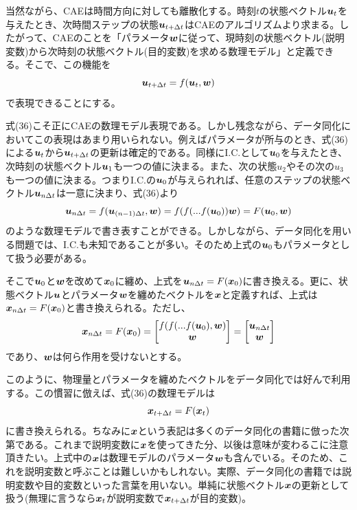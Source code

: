\documentclass[dvipdfmx, 9pt, a4paper]{jsarticle}
\newcommand{\bm}[1]{{\mbox{\boldmath $#1$}}}
\begin{document}
当然ながら、CAEは時間方向に対しても離散化する。時刻$t$の状態ベクトル$\bm u_t$を与えたとき、次時間ステップの状態$\bm u_{t+\Delta t}$はCAEのアルゴリズムより求まる。したがって、CAEのことを「パラメータ$\bm w$に従って、現時刻の状態ベクトル(説明変数)から次時刻の状態ベクトル(目的変数)を求める数理モデル」と定義できる。そこで、この機能を
\begin{equation}
\bm u_{t+\Delta t}=f(\bm u_t, \bm w)
\end{equation}
で表現できることにする。\par
式(36)こそ正にCAEの数理モデル表現である。しかし残念ながら、データ同化においてこの表現はあまり用いられない。例えばパラメータが所与のとき、式(36)による$\bm u_t$から$\bm u_{t+\Delta t}$の更新は確定的である。同様にI.C.として$\bm u_0$を与えたとき、次時刻の状態ベクトル$\bm u_1$も一つの値に決まる。また、次の状態$u_2$やその次の$u_3$も一つの値に決まる。つまりI.C.の$\bm u_0$が与えられれば、任意のステップの状態ベクトル$\bm u_{n\Delta t}$は一意に決まり、式(36)より
\begin{equation}
\bm u_{n\Delta t} =f(\bm u_{(n-1)\Delta t}, \bm w)=f(f( ... f(\bm u_0))\bm w)=F(\bm u_0, \bm w) \notag
\end{equation}
のような数理モデルで書き表すことができる。しかしながら、データ同化を用いる問題では、I.C.も未知であることが多い。そのため上式の$\bm u_0$もパラメータとして扱う必要がある。\par
そこで$\bm u_0$と$\bm w$を改めて$\bm x_0$に纏め、上式を$\bm u_{n\Delta t}=F(\bm x_0)$に書き換える。更に、状態ベクトル$\bm u$とパラメータ$\bm w$を纏めたベクトルを$\bm x$と定義すれば、上式は$\bm x_{n\Delta t}=F(\bm x_0)$と書き換えられる。ただし、
\begin{equation}
\bm x_{n\Delta t}=F(\bm x_0)=
\begin{bmatrix}
f(f(...f(\bm u_0), \bm w) \\ \bm w
\end{bmatrix}=
\begin{bmatrix}
\bm u_{n\Delta t} \\ \bm w
\end{bmatrix}\notag
\end{equation}
であり、$\bm w$は何ら作用を受けないとする。\par
このように、物理量とパラメータを纏めたベクトルをデータ同化では好んで利用する。この慣習に倣えば、式(36)の数理モデルは
\begin{equation}
\bm x_{t+\Delta t}=F(\bm x_t) \notag
\end{equation}
に書き換えられる。ちなみに$\bm x$という表記は多くのデータ同化の書籍に倣った次第である。これまで説明変数に$\bm x$を使ってきた分、以後は意味が変わるこに注意頂きたい。上式中の$\bm x$は数理モデルのパラメータ$\bm w$も含んでいる。そのため、これを説明変数と呼ぶことは難しいかもしれない。実際、データ同化の書籍では説明変数や目的変数といった言葉を用いない。単純に状態ベクトル$\bm x$の更新として扱う(無理に言うなら$\bm x_t$が説明変数で$\bm x_{t+\Delta t}$が目的変数)。\par
\end{document}
